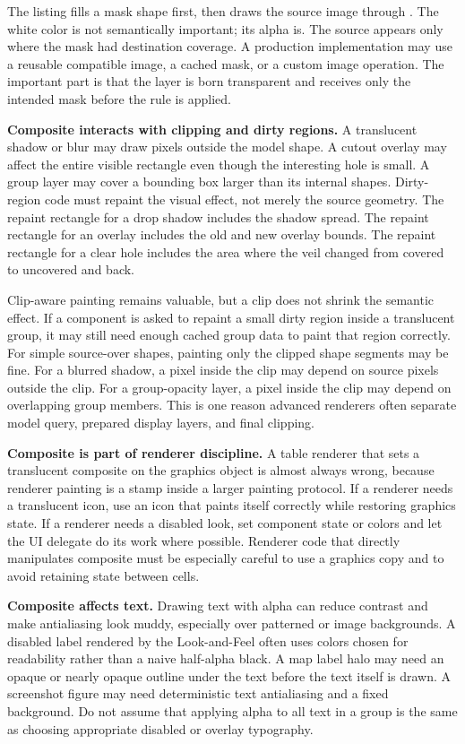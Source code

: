 The listing fills a mask shape first, then draws the source image through . The white color is not semantically important; its alpha is. The source appears only where the mask had destination coverage. A production implementation may use a reusable compatible image, a cached mask, or a custom image operation. The important part is that the layer is born transparent and receives only the intended mask before the rule is applied.

\textbf{Composite interacts with clipping and dirty regions.} A translucent shadow or blur may draw pixels outside the model shape. A cutout overlay may affect the entire visible rectangle even though the interesting hole is small. A group layer may cover a bounding box larger than its internal shapes. Dirty-region code must repaint the visual effect, not merely the source geometry. The repaint rectangle for a drop shadow includes the shadow spread. The repaint rectangle for an overlay includes the old and new overlay bounds. The repaint rectangle for a clear hole includes the area where the veil changed from covered to uncovered and back.

Clip-aware painting remains valuable, but a clip does not shrink the semantic effect. If a component is asked to repaint a small dirty region inside a translucent group, it may still need enough cached group data to paint that region correctly. For simple source-over shapes, painting only the clipped shape segments may be fine. For a blurred shadow, a pixel inside the clip may depend on source pixels outside the clip. For a group-opacity layer, a pixel inside the clip may depend on overlapping group members. This is one reason advanced renderers often separate model query, prepared display layers, and final clipping.

\textbf{Composite is part of renderer discipline.} A table renderer that sets a translucent composite on the graphics object is almost always wrong, because renderer painting is a stamp inside a larger painting protocol. If a renderer needs a translucent icon, use an icon that paints itself correctly while restoring graphics state. If a renderer needs a disabled look, set component state or colors and let the UI delegate do its work where possible. Renderer code that directly manipulates composite must be especially careful to use a graphics copy and to avoid retaining state between cells.

\textbf{Composite affects text.} Drawing text with alpha can reduce contrast and make antialiasing look muddy, especially over patterned or image backgrounds. A disabled label rendered by the Look-and-Feel often uses colors chosen for readability rather than a naive half-alpha black. A map label halo may need an opaque or nearly opaque outline under the text before the text itself is drawn. A screenshot figure may need deterministic text antialiasing and a fixed background. Do not assume that applying alpha to all text in a group is the same as choosing appropriate disabled or overlay typography.

